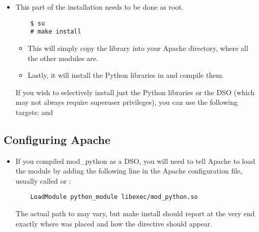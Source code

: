 \begin{itemize}

\item
  This part of the installation needs to be done as root. 
  \begin{verbatim}
    $ su
    # make install
  \end{verbatim}
  
  \begin{itemize}

  \item
    This will simply copy the library into your Apache 
    directory, where all the other modules are.


  \item
    Lastly, it will install the Python libraries in  and
    compile them. 

  \end{itemize} 

   If you wish to selectively install just the Python libraries
  or the DSO (which may not always require superuser
  privileges), you can use the following  targets:
   and 

\end{itemize}

\subsection{Configuring Apache\label{inst-apacheconfig}}

\begin{itemize}

\item
  If you compiled mod_python as a DSO, you will need to tell Apache to
  load the module by adding the following line in the Apache
  configuration file, usually called  or
  :

  \begin{verbatim}
    LoadModule python_module libexec/mod_python.so
  \end{verbatim}

  The actual path to  may vary, but make install
  should report at the very end exactly where 
  was placed and how the  directive should appear.

\end{itemize}

